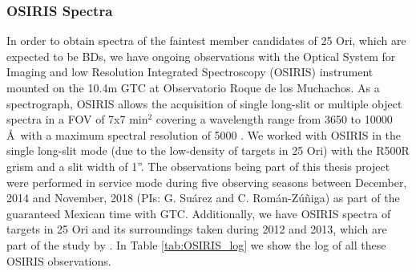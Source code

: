 \documentclass[12pt]{article}
\begin{document}
\subsubsection{OSIRIS Spectra}
\label{sec_OSIRIS:spectra}
In order to obtain spectra of the faintest member candidates of 25 Ori, which are expected to be BDs, we have ongoing observations with the Optical System for Imaging and low Resolution Integrated Spectroscopy (\ac{OSIRIS}) instrument mounted on the 10.4m GTC at Observatorio Roque de los Muchachos. As a spectrograph, OSIRIS allows the acquisition of single long-slit or multiple object spectra in a FOV of 7x7 min$^2$ covering a wavelength range from 3650 to 10000 \AA\ with a maximum spectral resolution of 5000 \citep{Cepa2000,Cepa2003}. We worked with OSIRIS in the single long-slit mode (due to the low-density of targets in 25 Ori) with the R500R grism and a slit width of 1''. The observations being part of this thesis project were performed in service mode during five observing seasons between December, 2014 and November, 2018 (PIs: G. Su\'arez and C. Rom\'an-Z\'u\~niga) as part of the guaranteed Mexican time with GTC. Additionally, we have OSIRIS spectra of targets in 25 Ori and its surroundings taken during 2012 and 2013, which are part of the study by \citet{Downes2015}. In Table \ref{tab:OSIRIS_log} we show the log of all these OSIRIS observations.
\end{document}
